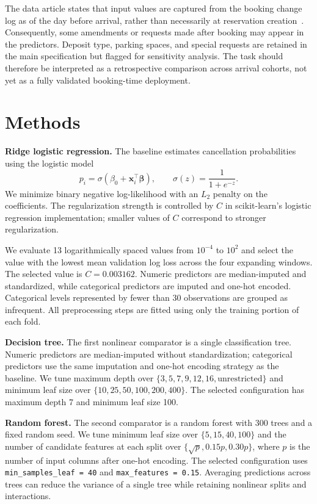 \documentclass{article}
\begin{document}
The data article states that input values are captured from the
booking change log as of the day before arrival, rather than
necessarily at reservation creation~\cite{antonio2019hotel}.
Consequently, some amendments or requests made after booking may
appear in the predictors. Deposit type, parking spaces, and special
requests are retained in the main specification but flagged for
sensitivity analysis. The task should therefore be interpreted as
a retrospective comparison across arrival cohorts, not yet as a
fully validated booking-time deployment.

\section{Methods}

\textbf{Ridge logistic regression.}
The baseline estimates cancellation probabilities using the logistic
model
\[
p_i = \sigma(\beta_0 + \mathbf{x}_i^\top\boldsymbol{\beta}),
\qquad
\sigma(z)=\frac{1}{1+e^{-z}}.
\]
We minimize binary negative log-likelihood with an $L_2$ penalty
on the coefficients. The regularization strength is controlled by
$C$ in scikit-learn's logistic regression implementation; smaller
values of $C$ correspond to stronger regularization.

We evaluate 13 logarithmically spaced values from $10^{-4}$ to
$10^2$ and select the value with the lowest mean validation log
loss across the four expanding windows. The selected value is
$C=0.003162$. Numeric predictors are median-imputed and standardized,
while categorical predictors are imputed and one-hot encoded.
Categorical levels represented by fewer than 30 observations are
grouped as infrequent. All preprocessing steps are fitted using
only the training portion of each fold.

\textbf{Decision tree.}
The first nonlinear comparator is a single classification tree.
Numeric predictors are median-imputed without standardization;
categorical predictors use the same imputation and one-hot encoding
strategy as the baseline. We tune maximum depth over
$\{3,5,7,9,12,16,\text{unrestricted}\}$ and minimum leaf size over
$\{10,25,50,100,200,400\}$. The selected configuration has maximum
depth 7 and minimum leaf size 100.

\textbf{Random forest.}
The second comparator is a random forest with 300 trees and a fixed
random seed. %
We tune minimum leaf size over $\{5,15,40,100\}$ and
the number of candidate features at each split over
$\{\sqrt{p},0.15p,0.30p\}$, where $p$ is the number of input columns
after one-hot encoding. The selected configuration uses
\texttt{min\_samples\_leaf = 40} and
\texttt{max\_features = 0.15}. Averaging predictions across trees
can reduce the variance of a single tree while retaining nonlinear
splits and interactions.
\end{document}
